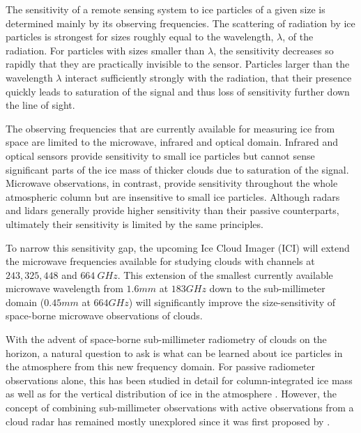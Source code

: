 \documentclass[journal abbreviation, manuscript]{copernicus}
\begin{document}
The sensitivity of a remote sensing system to ice particles of a given size is
determined mainly by its observing frequencies. The scattering of radiation
by ice particles is strongest for sizes roughly equal to the wavelength,
$\lambda$, of the radiation. For particles with sizes smaller than $\lambda$,
the sensitivity decreases so rapidly that they are practically invisible to the
sensor. Particles larger than the wavelength $\lambda$ interact sufficiently
strongly with the radiation, that their presence quickly leads to saturation of
the signal and thus loss of sensitivity further down the line of sight.

The observing frequencies that are currently available for measuring ice from
space are limited to the microwave, infrared and optical domain. Infrared and
optical sensors provide sensitivity to small ice particles but cannot sense
significant parts of the ice mass of thicker clouds due to saturation of the
signal. Microwave observations, in contrast, provide sensitivity throughout the
whole atmospheric column but are insensitive to small ice particles. Although
radars and lidars generally provide higher sensitivity than their passive
counterparts, ultimately their sensitivity is limited by the same principles.

To narrow this sensitivity gap, the upcoming Ice Cloud Imager (ICI) will extend
the microwave frequencies available for studying clouds with channels at $243,
325, 448$ and $664\ \unit{GHz}$. This extension of the smallest currently
available microwave wavelength from $1.6\unit{mm}$ at $183\unit{GHz}$ down to
the sub-millimeter domain ($0.45\unit{mm}$ at $664\unit{GHz}$) will
significantly improve the size-sensitivity of space-borne microwave observations
of clouds.

With the advent of space-borne sub-millimeter radiometry of clouds on the
horizon, a natural question to ask is what can be learned about ice particles in
the atmosphere from this new frequency domain. For passive radiometer
observations alone, this has been studied in detail for column-integrated ice
mass \citep{jimenez07, wang17, brath18a} as well as for the vertical
distribution of ice in the atmosphere \citep{grutzun18, aires19}. However, the
concept of combining sub-millimeter observations with active observations from a
cloud radar has remained mostly unexplored since it was first proposed by
\cite{evans05}.
\end{document}
